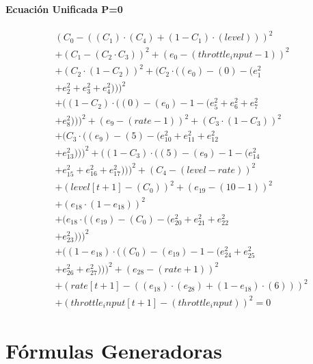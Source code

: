 \documentclass[10pt, a4paper]{article}
\begin{document}
\subsection*{Ecuación Unificada P=0}
\begin{align*}
& (C_{0} - ((C_{1})  \cdot  (C_{4}) + (1 - C_{1})  \cdot  (level)))^{2} \\
& + (C_{1} - (C_{2}  \cdot  C_{3}))^{2} + (e_{0} - (throttle_input - 1))^{2} \\
& + (C_{2}  \cdot  (1 - C_{2}))^{2} + (C_{2}  \cdot  ((e_{0}) - (0) - (e_{1}^{2} \\
& + e_{2}^{2} + e_{3}^{2} + e_{4}^{2})))^{2} \\
& + ((1 - C_{2})  \cdot  ((0) - (e_{0}) - 1 - (e_{5}^{2} + e_{6}^{2} + e_{7}^{2} \\
& + e_{8}^{2})))^{2} + (e_{9} - (rate - 1))^{2} + (C_{3}  \cdot  (1 - C_{3}))^{2} \\
& + (C_{3}  \cdot  ((e_{9}) - (5) - (e_{10}^{2} + e_{11}^{2} + e_{12}^{2} \\
& + e_{13}^{2})))^{2} + ((1 - C_{3})  \cdot  ((5) - (e_{9}) - 1 - (e_{14}^{2} \\
& + e_{15}^{2} + e_{16}^{2} + e_{17}^{2})))^{2} + (C_{4} - (level - rate))^{2} \\
& + (level[t+1] - (C_{0}))^{2} + (e_{19} - (10 - 1))^{2} \\
& + (e_{18}  \cdot  (1 - e_{18}))^{2} \\
& + (e_{18}  \cdot  ((e_{19}) - (C_{0}) - (e_{20}^{2} + e_{21}^{2} + e_{22}^{2} \\
& + e_{23}^{2})))^{2} \\
& + ((1 - e_{18})  \cdot  ((C_{0}) - (e_{19}) - 1 - (e_{24}^{2} + e_{25}^{2} \\
& + e_{26}^{2} + e_{27}^{2})))^{2} + (e_{28} - (rate + 1))^{2} \\
& + (rate[t+1] - ((e_{18})  \cdot  (e_{28}) + (1 - e_{18})  \cdot  (6)))^{2} \\
& + (throttle_input[t+1] - (throttle_input))^{2} = 0
\end{align*}\part{Fórmulas Generadoras}
\end{document}
